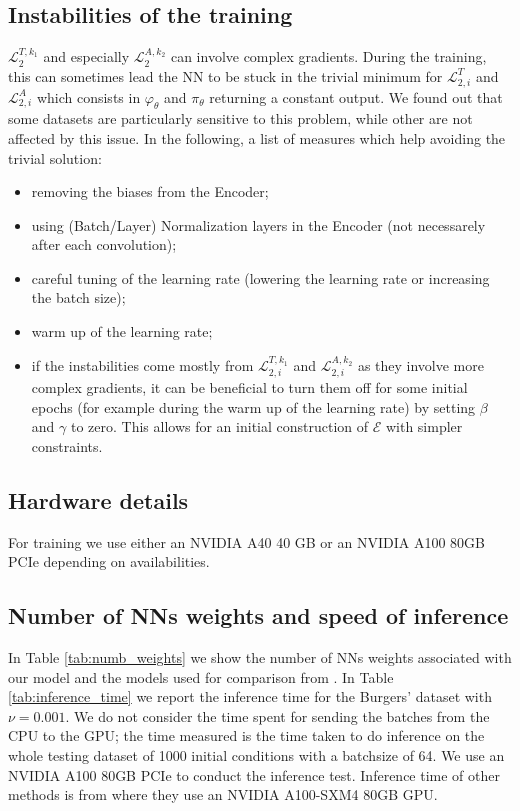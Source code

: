 \subsection{Instabilities of the training}
\label{subsubsec:instabilities}
$\mathcal{L}_{2}^{T,k_1} $ and especially $\mathcal{L}_{2}^{A,k_2}$ can involve complex gradients. During the training, this can sometimes lead the NN to be stuck in the trivial minimum for $\mathcal{L}_{2,i}^{T} $ and $ \mathcal{L}_{2,i}^{A}$ which consists in $\varphi_\theta$ and $\pi_\theta$ returning a constant output. We found out that some datasets are particularly sensitive to this problem, while other are not affected by this issue. In the following, a list of measures which help avoiding the trivial solution:
\begin{itemize}
    \item removing the biases from the Encoder;
    \item using (Batch/Layer) Normalization layers in the Encoder (not necessarely after each convolution);
    \item careful tuning of the learning rate (lowering the learning rate or increasing the batch size);
    \item warm up of the learning rate;
    \item if the instabilities come mostly from $\mathcal{L}_{2,i}^{T,k_1} $ and $\mathcal{L}_{2,i}^{A,k_2} $ as they involve more complex gradients, it can be beneficial to turn them off for some initial epochs (for example during the warm up of the learning rate) by setting $\beta$ and $\gamma$ to zero. This allows for an initial construction of $\mathcal{E}$ with simpler constraints.
\end{itemize}
\subsection{Hardware details}
For training we use either an NVIDIA A40 40 GB or an NVIDIA A100 80GB PCIe depending on availabilities. 
\subsection{Number of NNs weights and speed of inference}
\label{subsec:speed_and_numb_comp}
In Table \ref{tab:numb_weights} we show the number of NNs weights associated with our model and the models used for comparison from \cite{vcnef-hagnberger:2024}. In Table \ref{tab:inference_time} we report the inference time for the Burgers' dataset with $\nu=0.001$. We do not consider the time spent for sending the batches from the CPU to the GPU; the time measured is the time taken to do inference on the whole testing dataset of 1000 initial conditions with a batchsize of 64. We use an NVIDIA A100 80GB PCIe to conduct the inference test. Inference time of other methods is from \cite{vcnef-hagnberger:2024} where they use an NVIDIA A100-SXM4 80GB GPU.

